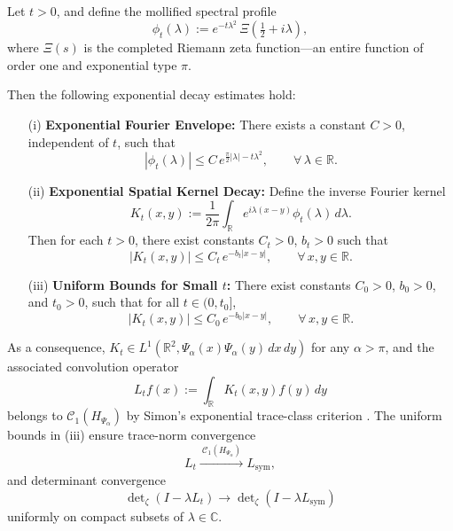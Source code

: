 \begin{lemma}
\label{lem:decay-mollified-kernel}
Let \( t > 0 \), and define the mollified spectral profile
\[
\phi_t(\lambda) := e^{-t\lambda^2} \, \Xi\left(\tfrac{1}{2} + i\lambda\right),
\]
where \( \Xi(s) \) is the completed Riemann zeta function—an entire function of order one and exponential type \( \pi \).

Then the following exponential decay estimates hold:

\begin{enumerate}
    \item[\textup{(i)}] \textbf{Exponential Fourier Envelope:} There exists a constant \( C > 0 \), independent of \( t \), such that
    \[
    |\phi_t(\lambda)| \le C \, e^{\frac{\pi}{2}|\lambda| - t\lambda^2}, \qquad \forall\, \lambda \in \mathbb{R}.
    \]

    \item[\textup{(ii)}] \textbf{Exponential Spatial Kernel Decay:} Define the inverse Fourier kernel
    \[
    K_t(x,y) := \frac{1}{2\pi} \int_{\mathbb{R}} e^{i\lambda(x - y)} \phi_t(\lambda)\,d\lambda.
    \]
    Then for each \( t > 0 \), there exist constants \( C_t > 0 \), \( b_t > 0 \) such that
    \[
    |K_t(x,y)| \le C_t\, e^{-b_t |x - y|}, \qquad \forall\, x, y \in \mathbb{R}.
    \]

    \item[\textup{(iii)}] \textbf{Uniform Bounds for Small \( t \):} There exist constants \( C_0 > 0 \), \( b_0 > 0 \), and \( t_0 > 0 \), such that for all \( t \in (0, t_0] \),
    \[
    |K_t(x,y)| \le C_0\, e^{-b_0 |x - y|}, \qquad \forall\, x, y \in \mathbb{R}.
    \]
\end{enumerate}

\noindent
As a consequence, \( K_t \in L^1(\mathbb{R}^2, \Psi_\alpha(x)\Psi_\alpha(y)\, dx\,dy) \) for any \( \alpha > \pi \), and the associated convolution operator
\[
L_t f(x) := \int_{\mathbb{R}} K_t(x,y) f(y)\, dy
\]
belongs to \( \mathcal{C}_1(H_{\Psi_\alpha}) \) by Simon's exponential trace-class criterion \cite[Thm.~4.2]{Simon2005TraceIdeals}. The uniform bounds in \textup{(iii)} ensure trace-norm convergence
\[
L_t \xrightarrow{\ \mathcal{C}_1(H_{\Psi_\alpha})\ } L_{\mathrm{sym}},
\]
and determinant convergence
\[
\det\nolimits_\zeta(I - \lambda L_t) \to \det\nolimits_\zeta(I - \lambda L_{\mathrm{sym}})
\]
uniformly on compact subsets of \( \lambda \in \mathbb{C} \).
\end{lemma}
